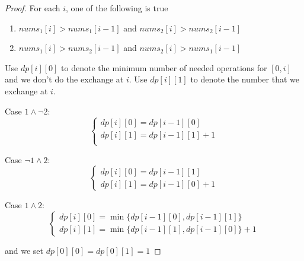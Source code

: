 \documentclass[11pt]{article}
\begin{document}
\begin{proof}
For each \(i\), one of the following is true
\begin{enumerate}
\item \(nums_1[i]>nums_1[i-1]\) and \(nums_2[i]>nums_2[i-1]\)
\item \(nums_1[i]>nums_2[i-1]\) and \(nums_2[i]>nums_1[i-1]\)
\end{enumerate}

Use \(dp[i][0]\) to denote the minimum number of needed operations for \([0,i]\) and we don't do
the exchange at \(i\). Use \(dp[i][1]\) to denote the number that we exchange at \(i\).

Case \(1\wedge \neg2\):
\begin{equation*}
\begin{cases}
dp[i][0]=dp[i-1][0]\\
dp[i][1]=dp[i-1][1]+1\\
\end{cases}
\end{equation*}

Case \(\neg1\wedge 2\):
\begin{equation*}
\begin{cases}
dp[i][0]=dp[i-1][1]\\
dp[i][1]=dp[i-1][0]+1
\end{cases}
\end{equation*}

Case \(1\wedge 2\):
\begin{equation*}
\begin{cases}
dp[i][0]=\min\{dp[i-1][0],dp[i-1][1]\}\\
dp[i][1]=\min\{dp[i-1][1],dp[i-1][0]\}+1
\end{cases}
\end{equation*}

and we set \(dp[0][0]=dp[0][1]=1\)
\end{proof}
\end{document}
